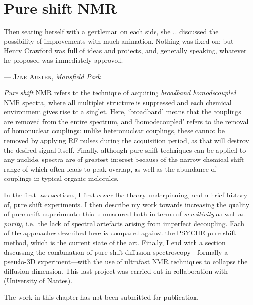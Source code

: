 \chapter{Pure shift NMR}
\label{chpt:pureshift}

\epigraph{\singlespacing%
Then seating herself with a gentleman on each side, she \ldots{} discussed the possibility of improvements with much animation. Nothing was fixed on; but Henry Crawford was full of ideas and projects, and, generally speaking, whatever he proposed was immediately approved.
}{--- \textsc{Jane Austen}, \textit{Mansfield Park}}

\textit{Pure shift} NMR refers to the technique of acquiring \textit{broadband homodecoupled} NMR spectra, where all multiplet structure is suppressed and each chemical environment gives rise to a singlet.\autocite{Zangger2015PNMRS,Castanar2017MRC}
Here, `broadband' means that the couplings are removed from the entire spectrum, and `homodecoupled' refers to the removal of homonuclear couplings: unlike heteronuclear couplings, these cannot be removed by applying RF pulses during the acquisition period, as that will destroy the desired signal itself.
Finally, although pure shift techniques can be applied to any nuclide, \proton{} spectra are of greatest interest because of the narrow chemical shift range of \proton{} which often leads to peak overlap, as well as the abundance of \proton{}--\proton{} couplings in typical organic molecules.

In the first two sections, I first cover the theory underpinning, and a brief history of, pure shift experiments.
I then describe my work towards increasing the quality of pure shift experiments: this is measured both in terms of \textit{sensitivity} as well as \textit{purity}, i.e.\ the lack of spectral artefacts arising from imperfect decoupling.
Each of the approaches described here is compared against the PSYCHE pure shift method, which is the current state of the art.
Finally, I end with a section discussing the combination of pure shift diffusion spectroscopy---formally a pseudo-3D experiment---with the use of ultrafast NMR techniques to collapse the diffusion dimension.
This last project was carried out in collaboration with \JND{} (University of Nantes).

The work in this chapter has not been submitted for publication.

\clearpage









\printbibliography[heading=subbibnumbered]{}
